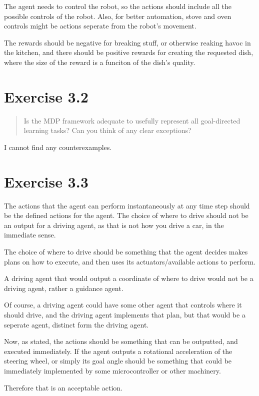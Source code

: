 \documentclass[a4paper,11pt,reqno]{amsart}
\begin{document}
The agent needs to control the robot, so the actions should include all the possible controls of the robot. Also, for better automation, stove and oven controls might be actions seperate from the robot's movement. 

The rewards should be negative for breaking stuff, or otherwise reaking havoc in the kitchen, and there should be positive rewards for creating the requested dish, where the size of the reward is a funciton of the dish's quality.

\section*{Exercise 3.2}
\begin{quote}
     Is the MDP framework adequate to usefully represent all goal-directed learning tasks? Can you think of any clear exceptions?
\end{quote}

I cannot find any counterexamples.

\section*{Exercise 3.3}

The actions that the agent can perform instantaneously at any time step should be the defined actions for the agent. The choice of where to drive should not be an output for a driving agent, as that is not how you drive a car, in the immediate sense. 

The choice of where to drive should be something that the agent decides makes plans on how to execute, and then uses its actuators/available actions to perform. 

A driving agent that would output a coordinate of where to drive would not be a driving agent, rather a guidance agent. 

Of course, a driving agent could have some other agent that controls where it should drive, and the driving agent implements that plan, but that would be a seperate agent, distinct form the driving agent. 

Now, as stated, the actions should be something that can be outputted, and executed immediately. If the agent outputs a rotational acceleration of the steering wheel, or simply its goal angle should be something that could be immediately implemented by some microcontroller or other machinery. 

Therefore that is an acceptable action. 
\end{document}
